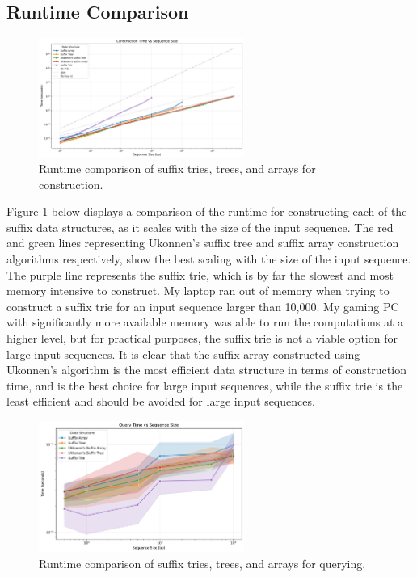 \documentclass[11pt, letterpaper]{article}
\begin{document}
\subsection{Runtime Comparison} 

\begin{figure}[ht]
  \centering
  \includegraphics[width=0.6\textwidth]{../figures/construction_time.png}
  \caption{Runtime comparison of suffix tries, trees, and arrays for construction.}
  \label{fig:construction_time}
\end{figure}


Figure \ref{fig:construction_time} below displays a comparison of the runtime for constructing each of the suffix data structures, as it scales with the size of the input sequence.
The red and green lines representing Ukonnen's suffix tree and suffix array construction algorithms respectively, show the best scaling with the size of the input sequence.
The purple line represents the suffix trie, which is by far the slowest and most memory intensive to construct. My laptop ran out of memory when trying to construct a suffix trie for an input sequence larger than 10,000.
My gaming PC with significantly more available memory was able to run the computations at a higher level, but for practical purposes, the suffix trie is not a viable option for large input sequences.
It is clear that the suffix array constructed using Ukonnen's algorithm is the most efficient data structure in terms of construction time, and is the best choice for large input sequences,
while the suffix trie is the least efficient and should be avoided for large input sequences. \\

\begin{figure}[ht]
  \centering
  \includegraphics[width=0.6\textwidth]{../figures/query_time_by_size.png}
  \caption{Runtime comparison of suffix tries, trees, and arrays for querying.}
  \label{fig:query_time}
\end{figure}
\end{document}
